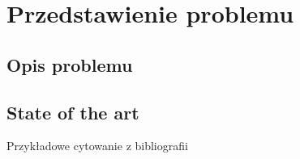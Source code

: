 \chapter{Przedstawienie problemu}

\section{Opis problemu}

\section{State of the art}
Przykładowe cytowanie z bibliografii~\cite{norrdine2012algebraic}
